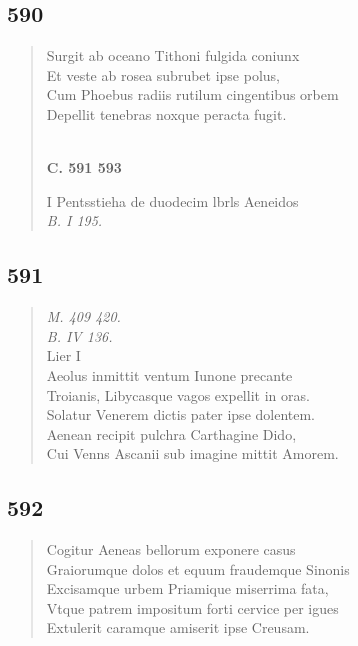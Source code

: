 \documentclass[11pt, a4paper]{report}
\begin{document}
            \subsection*{590}
      \begin{verse}
      Surgit ab oceano Tithoni fulgida coniunx \\ Et veste ab rosea subrubet ipse polus, \\ Cum Phoebus radiis rutilum cingentibus orbem \\ Depellit tenebras noxque peracta fugit. \\ 
        ﻿\pagebreak 
    \begin{center} \textbf{C. 591 593} \end{center} \marginpar{[83]} I Pentsstieha de duodecim lbrls Aeneidos \\ \textit{B. I 195.} \\ 
      \end{verse}
  
            \subsection*{591}
      \begin{verse}
      \textit{M. 409 420.} \\ \textit{B. IV 136.} \\ Lier I \\ Aeolus inmittit ventum Iunone precante \\ Troianis, Libycasque vagos expellit in oras. \\ Solatur Venerem dictis pater ipse dolentem. \\ Aenean recipit pulchra Carthagine Dido, \\ Cui Venns Ascanii sub imagine mittit Amorem. \\ 
      \end{verse}
  
            \subsection*{592}
      \begin{verse}
      Cogitur Aeneas bellorum exponere casus \\ Graiorumque dolos et equum fraudemque Sinonis \\ Excisamque urbem Priamique miserrima fata, \\ Vtque patrem impositum forti cervice per igues \\ Extulerit caramque amiserit ipse Creusam. \\ 
      \end{verse}
  
\end{document}
